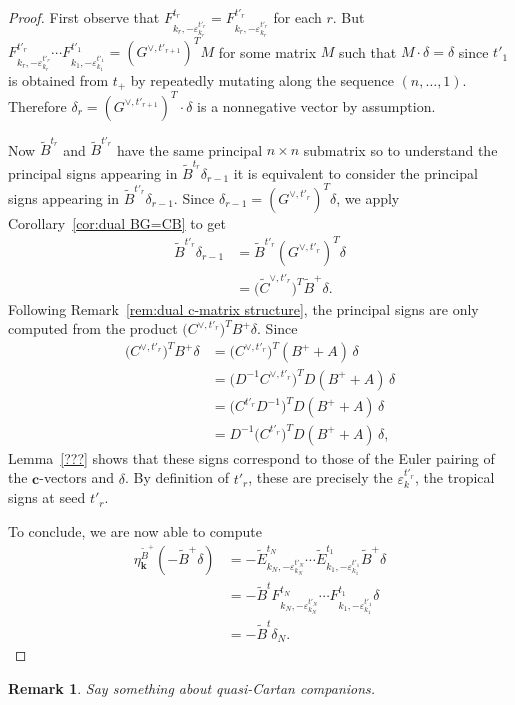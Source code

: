 \documentclass{amsart}
\newtheorem{remark}[theorem]{Remark}
\numberwithin{theorem}{section}
\newcommand{\bfc}{\boldsymbol{c}}
\newcommand{\bfk}{{\boldsymbol{k}}}
\begin{document}
  \begin{proof}
    First observe that $F^{t_r}_{k_r,-\varepsilon^{t'_r}_{k_r}}=F^{t'_r}_{k_r,-\varepsilon^{t'_r}_{k_r}}$ for each $r$.
    But $F^{t'_r}_{k_r,-\varepsilon^{t'_r}_{k_r}} \cdots F^{t'_1}_{k_1,-\varepsilon^{t'_1}_{k_1}}=(G^{\vee,t'_{r+1}})^T M$ for some matrix $M$ such that $M\cdot \delta=\delta$ since $t'_1$ is obtained from $t_+$ by repeatedly mutating along the sequence $(n,\ldots,1)$.
    Therefore $\delta_r = (G^{\vee,t'_{r+1}})^T \cdot \delta$ is a nonnegative vector by assumption.

    Now $\widetilde B^{t_r}$ and $\widetilde B^{t'_r}$ have the same principal $n\times n$ submatrix so to understand the principal signs appearing in $\widetilde B^{t_r} \delta_{r-1}$ it is equivalent to consider the principal signs appearing in $\widetilde B^{t'_r} \delta_{r-1}$.
    Since $\delta_{r-1} = (G^{\vee,t'_r})^T \delta$, we apply Corollary~\ref{cor:dual BG=CB} to get
    \begin{align*}
      \widetilde B^{t'_r} \delta_{r-1} 
      &= \widetilde B^{t'_r} (G^{\vee,t'_r})^T \delta\\
      &= \big(\widetilde C^{\vee,t'_r}\big)^T \widetilde B^+ \delta.
    \end{align*}
    Following Remark~\ref{rem:dual c-matrix structure}, the principal signs are only computed from the product $\big(C^{\vee,t'_r}\big)^T B^+ \delta$.
    Since 
    \begin{align*}
      \big(C^{\vee,t'_r}\big)^T B^+ \delta 
      &= \big(C^{\vee,t'_r}\big)^T (B^+ + A) \, \delta\\
      &= \big(D^{-1} C^{\vee,t'_r}\big)^T D(B^+ + A) \, \delta\\
      &= \big(C^{t'_r} D^{-1}\big)^T D(B^+ + A) \, \delta\\
      &= D^{-1} \big(C^{t'_r}\big)^T D(B^+ + A) \, \delta,
    \end{align*}
    Lemma~\ref{???} shows that these signs correspond to those of the Euler pairing of the $\bfc$-vectors and $\delta$.
    By definition of $t'_r$, these are precisely the $\varepsilon^{t'_r}_k$, the tropical signs at seed $t'_r$.

    To conclude, we are now able to compute 
    \begin{align*}
      \eta_\bfk^{\widetilde B^+}\left(-\widetilde B^+\delta\right)
      &= - \widetilde E^{t_N}_{k_N,-\varepsilon^{t'_N}_{k_N}} \cdots \widetilde E^{t_1}_{k_1,-\varepsilon^{t'_1}_{k_1}} \widetilde B^+ \delta\\
      &= - \widetilde B^t F^{t_N}_{k_N,-\varepsilon^{t'_N}_{k_N}} \cdots F^{t_1}_{k_1,-\varepsilon^{t'_1}_{k_1}} \delta\\
      &= - \widetilde B^t \delta_N.
    \end{align*}
  \end{proof}
  \begin{remark}
    Say something about quasi-Cartan companions.
  \end{remark}
\end{document}
